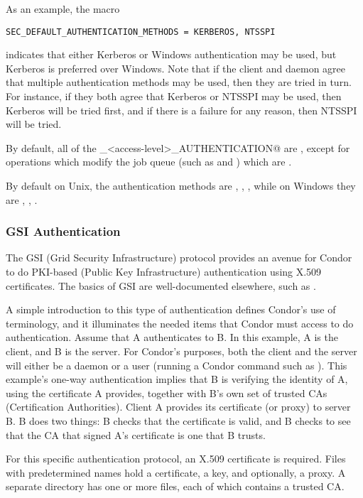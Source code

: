 As an example, the macro
\begin{verbatim}
SEC_DEFAULT_AUTHENTICATION_METHODS = KERBEROS, NTSSPI
\end{verbatim}
indicates that either Kerberos or Windows authentication may be used,
but Kerberos is preferred over Windows.
Note that if the client and daemon agree that multiple authentication
methods may be used, then they are tried in turn. For instance, if
they both agree that Kerberos or NTSSPI may be used, then Kerberos
will be tried first, and if there is a failure for any reason, then
NTSSPI will be tried. 


By default, all of the \verb@SEC_<access-level>_AUTHENTICATION@ are
\verb@OPTIONAL@,
except for operations which modify the job queue (such as
 and ) which are \verb@REQUIRED@.

By default on Unix, the authentication methods are \verb@FS@, \verb@KERBEROS@,
\verb@GSI@, while on Windows they are \verb@NTSSPI@, \verb@KERBEROS@, \verb@GSI@. 

\subsubsection{\label{sec:GSI-Authentication}GSI Authentication}
The GSI (Grid Security Infrastructure) protocol provides
an avenue for Condor to do
PKI-based (Public Key Infrastructure) authentication using X.509
certificates. 
The basics of GSI are well-documented elsewhere, such as
. 

A simple introduction to this type of authentication
defines Condor's use of terminology,
and it illuminates the needed items that Condor must access to
do authentication.
Assume that 
A authenticates to B.
In this example, A is the client, and B is the server.
For Condor's purposes, both the client and the server
will either be a daemon
or a user (running a Condor command such as ).
This example's one-way authentication implies that B
is verifying the identity of A,
using the certificate A provides,
together with B's own set of trusted CAs (Certification Authorities).
Client A provides its certificate (or proxy) to server B.
B does two things:
B checks that the certificate is valid,
and B checks to see that the CA that signed A's certificate
is one that B trusts.

For this specific authentication protocol,
an X.509 certificate is required.
Files with predetermined names hold a certificate,
a key, and optionally, a proxy.
A separate directory has one or more files, each of which contains
a trusted CA.


